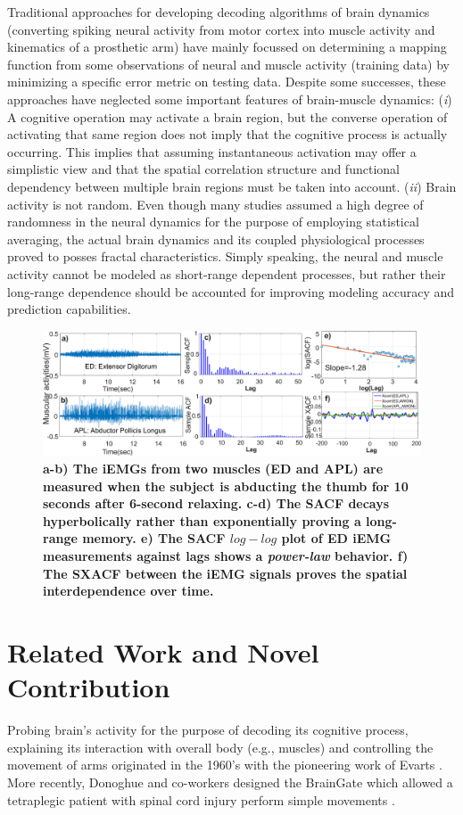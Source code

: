 \indent Traditional approaches for developing decoding algorithms of brain dynamics (converting spiking neural activity from motor cortex into muscle activity and kinematics of a prosthetic arm) have mainly focussed on determining a mapping function from some observations of neural and muscle activity (training data) by minimizing a specific error metric on testing data. Despite some successes, these approaches have neglected some important features of brain-muscle dynamics: (\textit{i}) A cognitive operation may activate a brain region, but the converse operation of activating that same region does not imply that the cognitive process is actually occurring. This implies that assuming instantaneous activation may offer a simplistic view and that the spatial correlation structure and functional dependency between multiple brain regions must be taken into account. (\textit{ii}) Brain activity is not random. Even though many studies assumed a high degree of randomness in the neural dynamics for the purpose of employing statistical averaging, the actual brain dynamics and its coupled physiological processes proved to posses fractal characteristics. Simply speaking, the neural and muscle activity cannot be modeled as short-range dependent processes, but rather their long-range dependence should be accounted for improving modeling accuracy and prediction capabilities. 
\begin{figure} %
\centering
\includegraphics[width=1\columnwidth]{raw_data_thumb_abct_revision.eps}
\vskip -3mm
\caption{\textbf{a-b) The iEMGs from two muscles (ED and APL) are measured when the subject is abducting the thumb for 10 seconds after 6-second relaxing. c-d) The SACF decays hyperbolically rather than exponentially proving a long-range memory. e) The SACF $log-log$ plot of ED iEMG measurements against lags shows a \textit{power-law} behavior. f) The SXACF between the iEMG signals proves the spatial interdependence over time.}}\label{fig:overview}
\end{figure} 
\section{Related Work and Novel Contribution}
Probing brain's activity for the purpose of decoding its cognitive process, explaining its interaction with overall body (e.g., muscles) and controlling the movement of arms originated in the 1960's with the pioneering work of Evarts \cite{Evarts}.  More recently, Donoghue and co-workers designed the BrainGate which allowed a tetraplegic patient with spinal cord injury perform simple movements \cite{Hochberg}.    

